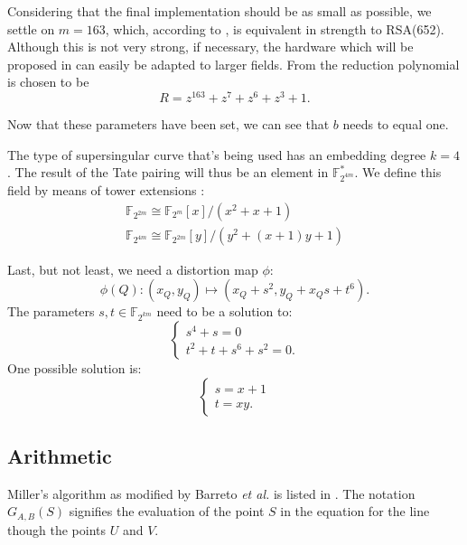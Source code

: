 Considering that the final implementation should be as small as possible, we settle on $m = 163$, which, according to \cite{lenstra}, is equivalent in strength to RSA(652). Although this is not very strong, if necessary, the hardware which will be proposed in  can easily be adapted to larger fields. From \cite{sec2} the reduction polynomial is chosen to be 
\begin{displaymath}
R = z^{163} + z^7 + z^6 + z^3 + 1.
\end{displaymath}

Now that these parameters have been set, we can see that $b$ needs to equal one.

The type of supersingular curve that's being used has an embedding degree $k = 4$. The result of the Tate pairing will thus be an element in $\mathbb{F}_{2^{4 m}}^*$. We define this field by means of tower extensions \cite{bertoni}:
\begin{displaymath}\begin{gathered}
\mathbb{F}_{2^{2 m}} \cong \mathbb{F}_{2^{m}}[x]/\left(x^2 + x + 1\right)\\
\mathbb{F}_{2^{4 m}} \cong \mathbb{F}_{2^{2 m}}[y]/\left(y^2 + (x + 1)y + 1\right)
\end{gathered}\end{displaymath}

Last, but not least, we need a distortion map $\phi$:
\begin{displaymath}
\phi(Q) : (x_Q, y_Q) \mapsto (x_Q + s^2, y_Q + x_Q s + t^6).
\end{displaymath}
The parameters $s, t \in \mathbb{F}_{2^{km}}$ need to be a solution to:
\begin{displaymath}\begin{cases}
s^4 + s = 0\\
t^2 + t + s^6 + s^2 = 0.
\end{cases}\end{displaymath}
One possible solution is:
\begin{displaymath}\begin{cases}
s = x + 1\\
t = xy.
\end{cases}\end{displaymath}


\subsection{Arithmetic}

Miller's algorithm as modified by Barreto \emph{et al.} is listed in . The notation $G_{A,B}(S)$ signifies the evaluation of the point $S$ in the equation for the line though the points $U$ and $V$.

